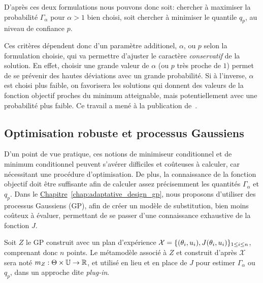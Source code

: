 \documentclass[../../Main_ManuscritThese.tex]{subfiles}
\newcommand{\frchap}[1]{\hyperref[#1]{Chapitre}~\ref{#1}}
\begin{document}
D'après ces deux formulations nous pouvons donc soit: chercher à
maximiser la probabilité $\Gamma_{\alpha}$ pour $\alpha > 1$ bien
choisi, soit chercher à minimiser le quantile $q_p$, au niveau de
confiance $p$.

Ces critères dépendent donc d'un paramètre additionel, $\alpha$, ou
$p$ selon la formulation choisie, qui va permettre d'ajuster le
caractère \emph{conservatif} de la solution. En effet, choisir une
grande valeur de $\alpha$ (ou $p$ très proche de $1$) permet de se
prévenir des hautes déviations avec un grande probabilité. Si à
l'inverse, $\alpha$ est choisi plus faible, on favorisera les
solutions qui donnent des valeurs de la fonction objectif proches du
minimum atteignable, mais potentiellement avec une probabilité plus
faible.  
Ce travail a mené à la publication de~\cite{trappler_robust_2020}.
  
\subsection*{Optimisation robuste et processus Gaussiens}
D'un point de vue pratique, ces notions de minimiseur conditionnel et
de minimum conditionnel peuvent s'avérer difficiles et coûteuses à
calculer, car nécessitant une procédure d'optimisation. De plus, la
connaissance de la fonction objectif doit être suffisante afin de
calculer assez précisemment les quantités $\Gamma_{\alpha}$ et $q_p$.
Dans le \frchap{chap:adaptative_design_gp}, nous proposons d'utiliser
des processus Gaussiens (GP), afin de créer un modèle de substitution,
bien moins coûteux à évaluer, permettant de se passer d'une
connaissance exhaustive de la fonction $J$.

Soit $Z$ le GP construit avec un plan d'expérience
$\mathcal{X}=\{(\theta_i, u_i), J(\theta_i, u_i)\}_{1\leq i \leq n}$,
comprenant donc $n$ points.  Le métamodèle associé à $Z$ et construit
d'après $\mathcal{X}$ sera noté
$m_Z:\Theta\times \mathbb{U} \rightarrow \mathbb{R}$, et utilisé en lieu
et en place de $J$ pour estimer $\Gamma_{\alpha}$ ou $q_p$, dans un
approche dite \emph{plug-in}.
\end{document}
